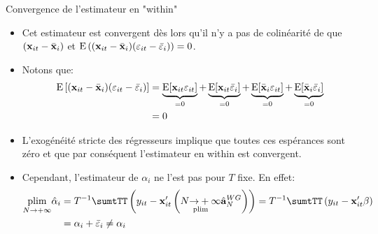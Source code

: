 \begin{frame}[allowframebreaks]{Convergence de l'estimateur en "within"}
\begin{itemize}
    \item Cet estimateur est convergent dès lors qu'il n'y a pas de colinéarité  de que $\left({\mathbf x}_{it} - \bar{{\mathbf x}}_i\right) $ et
    $\operatorname{E}\left(({\mathbf x}_{it} - \bar{{\mathbf x}}_i) (\varepsilon_{it} - \bar{\varepsilon}_i)\right) = 0$.
    
    \item Notons que:
    \begin{align*}
    \operatorname{E}\left[({\mathbf x}_{it} - \bar{{\mathbf x}}_i) (\varepsilon_{it} - \bar{\varepsilon}_i)\right]  &=\underbrace{\operatorname{E}[{\mathbf x}_{it}\varepsilon_{it}]}_{=0} +
    \underbrace{\operatorname{E}[{\mathbf x}_{it}\bar{\varepsilon}_i]}_{=0} + \underbrace{\operatorname{E}[\bar{{\mathbf x}}_i\varepsilon_{it}]}_{=0} + 
    \underbrace{\operatorname{E}[\bar{{\mathbf x}}_i\bar{\varepsilon}_i]}_{=0}\\
    &=0
    \end{align*}
    
    \item L'exogénéité stricte des régresseurs implique que toutes ces espérances sont zéro et 
    que par conséquent l'estimateur en within 
    est convergent.
    \item Cependant, l'estimateur de $\alpha_i$ ne l'est pas pour $T$ fixe. En effet:
    \begin{align*}
    \underset{N\to + \infty}{\plim} \hat{\alpha}_i &= T^{-1}\sumtTT\left(y_{it} - 
    \boldx_{it}^\prime\left(\underset{\plim}{N\to +\infty} \hat{\bolda}_N^{WG}\right)\right) 
    = T^{-1}\sumtTT\left(y_{it}- \boldx_{it}^\prime\beta\right)\\
    &=\alpha_i + \bar{\varepsilon}_i\neq \alpha_i
    \end{align*}
\end{itemize}
\end{frame}

